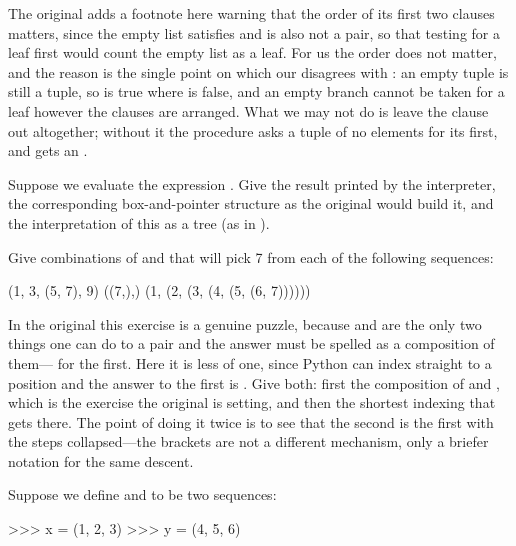 The original adds a footnote here warning that the order of its first two
clauses matters, since the empty list satisfies  and is also not a
pair, so that testing for a leaf first would count the empty list as a leaf.
For us the order does not matter, and the reason is the single point on which
our  disagrees with : an empty tuple is still a
tuple, so  is true where  is false, and an
empty branch cannot be taken for a leaf however the clauses are arranged.  What
we may not do is leave the clause out altogether; without it the procedure asks
a tuple of no elements for its first, and gets an .

\begin{exerciseGroup}
\label{Exercise 2.24}
 Suppose we evaluate the
expression .  Give the result printed by the
interpreter, the corresponding box-and-pointer structure as the original would
build it, and the interpretation of this as a tree (as in ).

\label{Exercise 2.25}
 Give combinations of \code{[0]}
and \code{[1:]} that will pick 7 from each of the following sequences:

\begin{codeBlock}
(1, 3, (5, 7), 9)
((7,),)
(1, (2, (3, (4, (5, (6, 7))))))
\end{codeBlock}

In the original this exercise is a genuine puzzle, because  and
 are the only two things one can do to a pair and the answer must be
spelled as a composition of them--- for the
first.  Here it is less of one, since Python can index straight to a position
and the answer to the first is .  Give both: first the
composition of \code{[0]} and \code{[1:]}, which is the exercise the original
is setting, and then the shortest indexing that gets there.  The point of doing
it twice is to see that the second is the first with the steps collapsed---the
brackets are not a different mechanism, only a briefer notation for the same
descent.

\label{Exercise 2.26}
 Suppose we define  and
 to be two sequences:

\begin{codeBlock}
>>> x = (1, 2, 3)
>>> y = (4, 5, 6)
\end{codeBlock}


\end{exerciseGroup}
